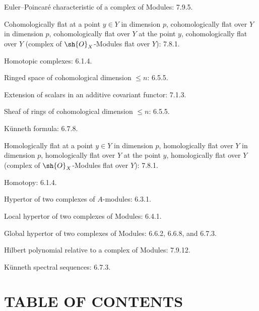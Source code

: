 \begin{flushleft}
Euler--Poincaré characteristic of a complex of Modules: 7.9.5.

\medskip
Cohomologically flat at a point $y\in Y$ in dimension $p$,
cohomologically flat over $Y$ in dimension $p$, cohomologically flat over
$Y$ at the point $y$, cohomologically flat over $Y$ (complex of
$\sh{O}_X$-Modules flat over $Y$): 7.8.1.

\medskip
Homotopic complexes: 6.1.4.

\medskip
Ringed space of cohomological dimension $\leq n$: 6.5.5.

\medskip
Extension of scalars in an additive covariant functor: 7.1.3.

\medskip
Sheaf of rings of cohomological dimension $\leq n$: 6.5.5.

\medskip
Künneth formula: 6.7.8.

\medskip
Homologically flat at a point $y\in Y$ in dimension $p$, homologically flat
over $Y$ in dimension $p$, homologically flat over $Y$ at the point $y$,
homologically flat over $Y$ (complex of $\sh{O}_X$-Modules flat over $Y$):
7.8.1.

\medskip
Homotopy: 6.1.4.

\medskip
Hypertor of two complexes of $A$-modules: 6.3.1.

\medskip
Local hypertor of two complexes of Modules: 6.4.1.

\medskip
Global hypertor of two complexes of Modules: 6.6.2, 6.6.8, and 6.7.3.

\medskip
Hilbert polynomial relative to a complex of Modules: 7.9.12.

\medskip
Künneth spectral sequences: 6.7.3.
\end{flushleft}

\clearpage
{}
\section*{TABLE OF CONTENTS}

